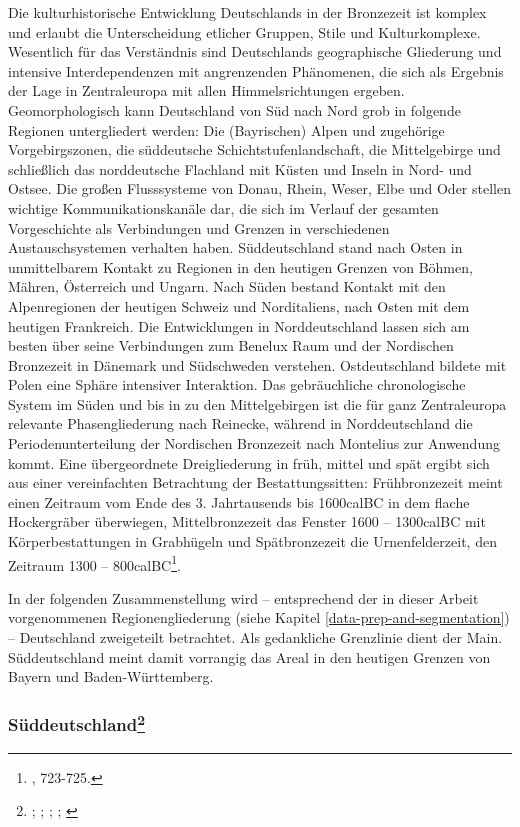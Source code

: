 \documentclass[openany,twoside,twocolumn]{book}
\let\rmarkdownfootnote\footnote%
\def\footnote{\protect\rmarkdownfootnote}
\begin{document}
Die kulturhistorische Entwicklung Deutschlands in der Bronzezeit ist komplex und erlaubt die Unterscheidung etlicher Gruppen, Stile und Kulturkomplexe. Wesentlich für das Verständnis sind Deutschlands geographische Gliederung und intensive Interdependenzen mit angrenzenden Phänomenen, die sich als Ergebnis der Lage in Zentraleuropa mit allen Himmelsrichtungen ergeben. Geomorphologisch kann Deutschland von Süd nach Nord grob in folgende Regionen untergliedert werden: Die (Bayrischen) Alpen und zugehörige Vorgebirgszonen, die süddeutsche Schichtstufenlandschaft, die Mittelgebirge und schließlich das norddeutsche Flachland mit Küsten und Inseln in Nord- und Ostsee. Die großen Flusssysteme von Donau, Rhein, Weser, Elbe und Oder stellen wichtige Kommunikationskanäle dar, die sich im Verlauf der gesamten Vorgeschichte als Verbindungen und Grenzen in verschiedenen Austauschsystemen verhalten haben. Süddeutschland stand nach Osten in unmittelbarem Kontakt zu Regionen in den heutigen Grenzen von Böhmen, Mähren, Österreich und Ungarn. Nach Süden bestand Kontakt mit den Alpenregionen der heutigen Schweiz und Norditaliens, nach Osten mit dem heutigen Frankreich. Die Entwicklungen in Norddeutschland lassen sich am besten über seine Verbindungen zum Benelux Raum und der Nordischen Bronzezeit in Dänemark und Südschweden verstehen. Ostdeutschland bildete mit Polen eine Sphäre intensiver Interaktion. Das gebräuchliche chronologische System im Süden und bis in zu den Mittelgebirgen ist die für ganz Zentraleuropa relevante Phasengliederung nach Reinecke, während in Norddeutschland die Periodenunterteilung der Nordischen Bronzezeit nach Montelius zur Anwendung kommt. Eine übergeordnete Dreigliederung in früh, mittel und spät ergibt sich aus einer vereinfachten Betrachtung der Bestattungssitten: Frühbronzezeit meint einen Zeitraum vom Ende des 3. Jahrtausends bis 1600calBC in dem flache Hockergräber überwiegen, Mittelbronzezeit das Fenster 1600 -- 1300calBC mit Körperbestattungen in Grabhügeln und Spätbronzezeit die Urnenfelderzeit, den Zeitraum 1300 -- 800calBC\footnote{\textcite{jockenhovel_germany_2013}, 723-725.}.

In der folgenden Zusammenstellung wird -- entsprechend der in dieser Arbeit vorgenommenen Regionengliederung (siehe Kapitel \ref{data-prep-and-segmentation}) -- Deutschland zweigeteilt betrachtet. Als gedankliche Grenzlinie dient der Main. Süddeutschland meint damit vorrangig das Areal in den heutigen Grenzen von Bayern und Baden-Württemberg.

\hypertarget{suddeutschland}{%
\subsubsection[Süddeutschland]{\texorpdfstring{Süddeutschland\footnote{\textcite{falkenstein_development_2012}; \textcite{falkenstein_zum_2017}; \textcite{jockenhovel_germany_2013}; \textcite{kreutle_urnenfelderkultur_2007}; \textcite{wiesner_grabbau_2009}}}{Süddeutschland}}\label{suddeutschland}}
\end{document}
